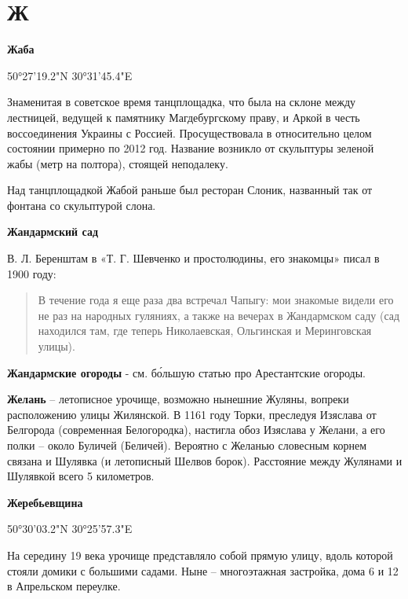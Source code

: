 \chapter*{Ж}

\textbf{Жаба}

50°27'19.2"N 30°31'45.4"E

Знаменитая в советское время танцплощадка, что была на склоне между лестницей, ведущей к памятнику Магдебургскому праву, и Аркой в честь воссоединения Украины с Россией. Просуществовала в относительно целом состоянии  примерно по 2012 год. Название возникло от скульптуры зеленой жабы (метр на полтора), стоящей неподалеку.

Над танцплощадкой Жабой раньше был ресторан Слоник, названный так от фонтана со скульптурой слона.\\

\medskip

\textbf{Жандармский сад} 

В. Л. Беренштам в «Т. Г. Шевченко и простолюдины, его знакомцы» писал в 1900 году:

\begin{quotation}
В течение года я еще раза два встречал Чапыгу: мои знакомые видели его не раз на народных гуляниях, а также на вечерах в Жандармском саду (сад находился там, где теперь Николаевская, Ольгинская и Меринговская улицы).
\end{quotation}

\medskip

\textbf{Жандармские огороды} - см. б\'ольшую статью про Арестантские огороды.\\

\medskip


\textbf{Желань} – летописное урочище, возможно нынешние Жуляны, вопреки расположению улицы Жилянской. В 1161 году Торки, преследуя Изяслава от Белгорода (современная Белогородка), настигла обоз Изяслава у Желани, а его полки – около Буличей (Беличей). Вероятно с Желанью словесным корнем связана и Шулявка (и летописный Шелвов борок). Расстояние между Жулянами и Шулявкой всего 5 километров.\\ 

\medskip

\textbf{Жеребьевщина}

50°30'03.2"N 30°25'57.3"E

На середину 19 века урочище представляло собой прямую улицу, вдоль которой стояли домики с большими садами. Ныне – многоэтажная застройка, дома 6 и 12 в Апрельском переулке.


